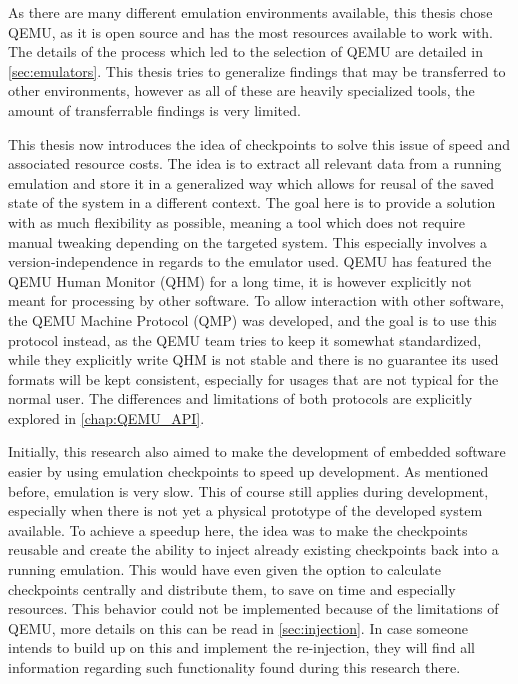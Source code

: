 As there are many different emulation environments available,
this thesis chose QEMU, as it is open source and has the most resources available to work with.
The details of the process which led to the selection of QEMU are detailed in \autoref{sec:emulators}.
This thesis tries to generalize findings that may be transferred to other environments,
however as all of these are heavily specialized tools,
the amount of transferrable findings is very limited.

This thesis now introduces the idea of checkpoints to solve this issue of speed and associated resource costs.
The idea is to extract all relevant data from a running emulation
and store it in a generalized way which allows for reusal of the saved state of the system in a different context.
The goal here is to provide a solution with as much flexibility as possible,
meaning a tool which does not require manual tweaking depending on the targeted system.
This especially involves a version-independence in regards to the emulator used.
QEMU has featured the QEMU Human Monitor (QHM) for a long time,
it is however explicitly not meant for processing by other software.
To allow interaction with other software, the QEMU Machine Protocol (QMP) was developed, and the goal is to use this protocol instead,
as the QEMU team tries to keep it somewhat standardized,
while they explicitly write QHM is not stable and there is no guarantee its used formats will be kept consistent,
especially for usages that are not typical for the normal user.
The differences and limitations of both protocols are explicitly explored in \autoref{chap:QEMU_API}.

Initially, this research also aimed to make the development of embedded software easier by using emulation checkpoints to speed up development.
As mentioned before, emulation is very slow.
This of course still applies during development, especially when there is not yet a physical prototype of the developed system available.
To achieve a speedup here, the idea was to make the checkpoints reusable
and create the ability to inject already existing checkpoints back into a running emulation.
This would have even given the option to calculate checkpoints centrally and distribute them,
to save on time and especially resources.
This behavior could not be implemented because of the  limitations of QEMU,
more details on this can be read in \autoref{sec:injection}.
In case someone intends to build up on this and implement the re-injection,
they will find all information regarding such functionality found during this research there.